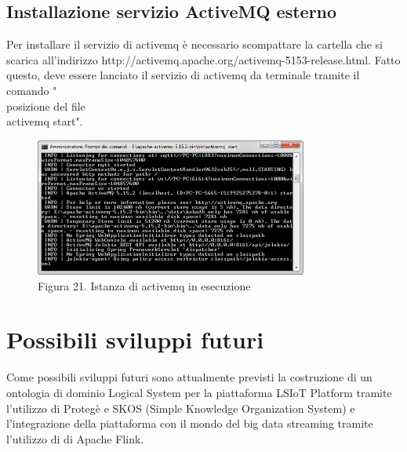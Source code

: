 \subsection{Installazione servizio ActiveMQ esterno}
Per installare il servizio di activemq è necessario scompattare la cartella che si scarica all'indirizzo http://activemq.apache.org/activemq-5153-release.html. Fatto questo, deve essere lanciato il servizio di activemq da terminale tramite il comando "\\posizione del file\\activemq start".
\begin{figure}[h]
	\centering
	\includegraphics[width=0.8\textwidth]{activemq-in-esecuzione.png}
	\caption*{Figura 21. Istanza di activemq in esecuzione}
\end{figure}
\newpage
\section{Possibili sviluppi futuri}
Come possibili sviluppi futuri sono attualmente previsti la costruzione di un ontologia di dominio Logical System per la piattaforma LSIoT Platform tramite l'utilizzo di Protegè e SKOS (Simple Knowledge Organization System) e l'integrazione della piattaforma con il mondo del big data streaming tramite l'utilizzo di di Apache Flink.
